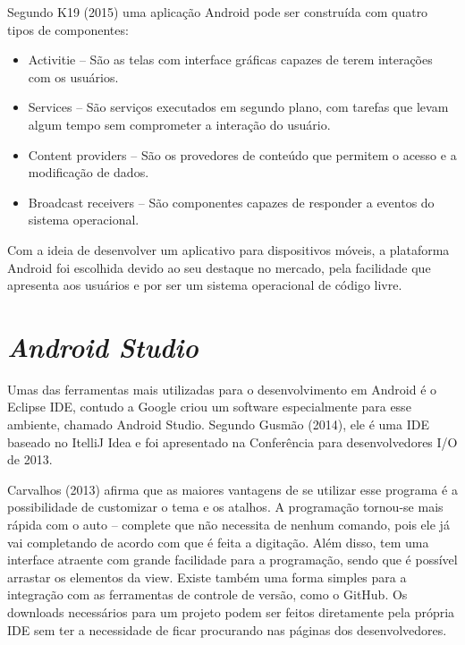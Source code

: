 	\par Segundo K19 (2015) uma aplicação Android pode ser construída com quatro
tipos de componentes:

	\begin{itemize}
	  \item Activitie – São as telas com interface gráficas capazes de terem
	  		interações com os usuários.
	  \item Services – São serviços executados em segundo plano, com tarefas que
	  		levam algum tempo sem comprometer a interação do usuário.
	  \item Content providers – São os provedores de conteúdo que permitem o acesso e
			a modificação de dados.
	\item Broadcast receivers – São componentes capazes de responder a eventos do
			sistema operacional.
	\end{itemize}

	\par Com a ideia de desenvolver um aplicativo para dispositivos móveis, a
plataforma Android foi escolhida devido ao seu destaque no mercado, pela
facilidade que apresenta aos usuários e por ser um sistema operacional de
código livre.

\section{\textit{Android Studio}}

	\par Umas das ferramentas mais utilizadas para o desenvolvimento em Android é o
Eclipse IDE, contudo a Google criou um software especialmente para esse
ambiente, chamado Android Studio. Segundo Gusmão (2014), ele é uma IDE baseado
no ItelliJ Idea e foi apresentado na Conferência para desenvolvedores I/O de
2013.

	\par Carvalhos (2013) afirma que as maiores vantagens de se utilizar esse
programa é a possibilidade de customizar o tema e os atalhos. A programação
tornou-se mais rápida com o auto – complete que não necessita de nenhum
comando, pois ele já vai completando de acordo com que é feita a digitação.
Além disso, tem uma interface atraente com grande facilidade para a
programação, sendo que é possível arrastar os elementos da view. Existe também
uma forma simples para a integração com as ferramentas de controle de versão,
como o GitHub. Os downloads necessários para um projeto podem ser feitos
diretamente pela própria IDE sem ter a necessidade de ficar procurando nas
páginas dos desenvolvedores.

